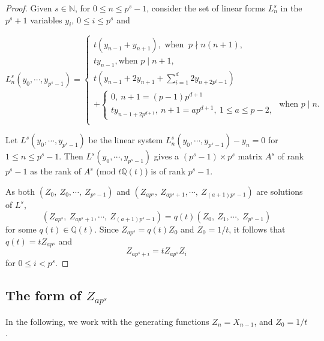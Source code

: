 \documentclass[11 pt]{amsart}
\theoremstyle{plain}
\theoremstyle{definition}
\theoremstyle{remark}
\def\Q{\mathbb{Q}}
\def\N{\mathbb{N}}
\begin{document}
\begin{proof}
    


Given $s\in \N$, for $0 \le n \le p^s-1$, consider the set of linear forms $L_n^s$ in the $p^s+1$ variables $y_i$, $0 \le i \le p^s$ and

\begin{equation*}
     L_n^s(y_{0}, \cdots, y_{p^s-1})
     =\begin{cases}
         t(y_{n-1}+y_{n+1}), \text{ when } \ p \nmid n(n+1),\\
         t y_{n-1}, \text{when } p \mid n+1,\\         
         t(y_{n-1}+2y_{n+1}+\sum_{i=1}^d 2y_{n+2p^i-1})
    \\
    +\begin{cases}
        0,\ n+1=(p-1)p^{d+1}\\
        ty_{n-1+2p^{d+1}},\ n+1=ap^{d+1},\ 1\le a \le p-2, 
        \end{cases} 
        \text{ when }p \mid n.
        \\        
     \end{cases}
 \end{equation*}

Let $L^s(y_{0}, \cdots, y_{p^s-1})$ be the linear system $L_n^s(y_{0}, \cdots, y_{p^s-1})-y_n=0$ for $1 \le n \le p^s-1$. Then $L^s(y_{0}, \cdots, y_{p^s-1})$ gives a $(p^s-1) \times p^s$ matrix $A^s$ of rank $p^s-1$ as the rank of $A^s$ (mod $t\Q(t)$) is of rank $p^s-1$.




As both $(Z_{0},\ Z_0,\cdots,\ Z_{p^{s}-1})$ and $(Z_{ap^{s}},\ Z_{ap^{s}+1},\cdots,\ Z_{(a+1)p^{s}-1})$ are solutions of $L^s$, $$(Z_{ap^{s}},\ Z_{ap^{s}+1},\cdots,\ Z_{(a+1)p^{s}-1})=q(t)(Z_{0},\ Z_1,\cdots,\ Z_{p^{s}-1})$$ for some $q(t) \in \Q(t)$. Since $Z_{ap^{s}}=q(t) Z_{0}$ and $Z_{0}=1/t$, it follows that $q(t)=t Z_{ap^{s}}$ and $$Z_{ap^s+i}=tZ_{ap^s}Z_i$$ for $0\le i< p^s$. 

 \end{proof}





\subsection{The form of $Z_{ap^s}$}
In the following, we work with the generating functions $Z_n=X_{n-1}$, and $Z_0=1/t$.


\end{document}
